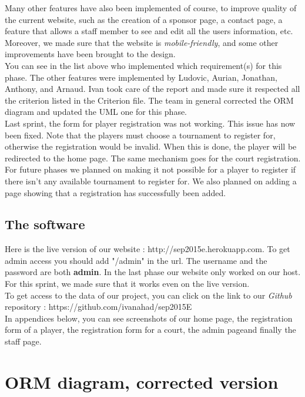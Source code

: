 \documentclass[a4paper, 12pt]{article}
\begin{document}
Many other features have also been implemented of course, to improve quality of the current website, such as the creation of a sponsor page, a contact page, a feature that allows a staff member to see and edit all the users information, etc. Moreover, we made sure that the website is \textit{mobile-friendly}, and some other improvements have been brought to the design.\\

You can see in the list above who implemented which requirement(s) for this phase. The other features were implemented by Ludovic, Aurian, Jonathan, Anthony, and Arnaud. Ivan took care of the report and made sure it respected all the criterion listed in the Criterion file. The team in general corrected the ORM diagram and updated the UML one for this phase. \\

Last sprint, the form for player registration was not working. This issue has now been fixed. Note that the players must choose a tournament to register for, otherwise the registration would be invalid. When this is done, the player will be redirected to the home page. The same mechanism goes for the court registration.  For future phases we planned on making it not possible for a player to register if there isn't any available tournament to register for. We also planned on adding a page showing that a registration has successfully been added.\\

\subsection{The software}

Here is the live version of our website : http://sep2015e.herokuapp.com.  To get admin access you should add "/admin" in the url. The username and the password are both \textbf{admin}. In the last phase our website only worked on our host. For this sprint, we made sure that it works even on the live version.\\

To get access to the data of our project, you can click on the link to our \textit{Github} repository : https://github.com/ivanahad/sep2015E\\ 

In appendices below, you can see screenshots of our home page, the registration form of a player, the registration form for a court, the admin  pageand finally the staff page.

\section{ORM diagram, corrected version}
\end{document}
